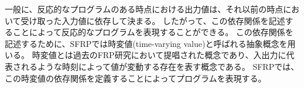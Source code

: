 一般に、反応的なプログラムのある時点における出力値は、それ以前の時点において受け取った入力値に依存して決まる。
したがって、この依存関係を記述することによって反応的なプログラムを表現することができる。
この依存関係を記述するために、SFRPでは時変値(time-varying value)と呼ばれる抽象概念を用いる。
時変値とは過去のFRP研究において提唱された概念であり、入出力に代表されるような時刻によって値が変動する存在を表す概念である。
SFRPでは、この時変値の依存関係を定義することによってプログラムを表現する。
